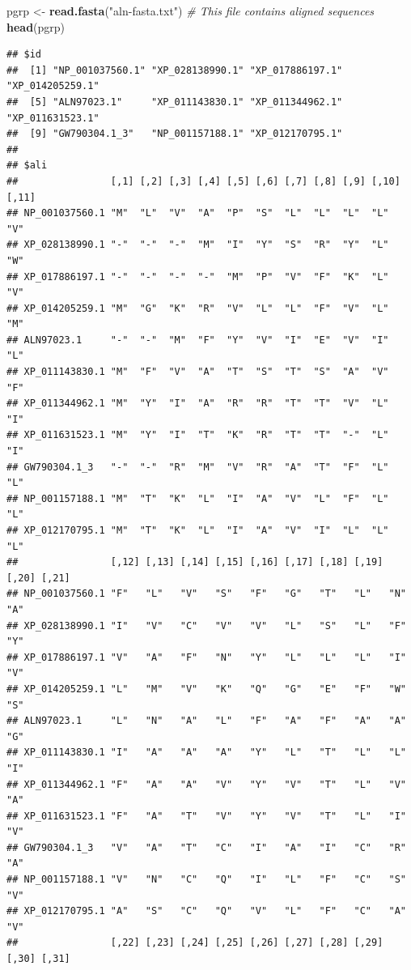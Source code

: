 \documentclass[]{article}
\newenvironment{Shaded}{\begin{snugshade}}{\end{snugshade}}
\newcommand{\KeywordTok}[1]{\textcolor[rgb]{0.13,0.29,0.53}{\textbf{#1}}}
\newcommand{\StringTok}[1]{\textcolor[rgb]{0.31,0.60,0.02}{#1}}
\newcommand{\CommentTok}[1]{\textcolor[rgb]{0.56,0.35,0.01}{\textit{#1}}}
\newcommand{\NormalTok}[1]{#1}
\begin{document}
\begin{Shaded}
\begin{Highlighting}[]
\NormalTok{pgrp <-}\StringTok{ }\KeywordTok{read.fasta}\NormalTok{(}\StringTok{"aln-fasta.txt"}\NormalTok{) }\CommentTok{# This file contains aligned sequences}
\KeywordTok{head}\NormalTok{(pgrp)}
\end{Highlighting}
\end{Shaded}

\begin{verbatim}
## $id
##  [1] "NP_001037560.1" "XP_028138990.1" "XP_017886197.1" "XP_014205259.1"
##  [5] "ALN97023.1"     "XP_011143830.1" "XP_011344962.1" "XP_011631523.1"
##  [9] "GW790304.1_3"   "NP_001157188.1" "XP_012170795.1"
## 
## $ali
##                [,1] [,2] [,3] [,4] [,5] [,6] [,7] [,8] [,9] [,10] [,11]
## NP_001037560.1 "M"  "L"  "V"  "A"  "P"  "S"  "L"  "L"  "L"  "L"   "V"  
## XP_028138990.1 "-"  "-"  "-"  "M"  "I"  "Y"  "S"  "R"  "Y"  "L"   "W"  
## XP_017886197.1 "-"  "-"  "-"  "-"  "M"  "P"  "V"  "F"  "K"  "L"   "V"  
## XP_014205259.1 "M"  "G"  "K"  "R"  "V"  "L"  "L"  "F"  "V"  "L"   "M"  
## ALN97023.1     "-"  "-"  "M"  "F"  "Y"  "V"  "I"  "E"  "V"  "I"   "L"  
## XP_011143830.1 "M"  "F"  "V"  "A"  "T"  "S"  "T"  "S"  "A"  "V"   "F"  
## XP_011344962.1 "M"  "Y"  "I"  "A"  "R"  "R"  "T"  "T"  "V"  "L"   "I"  
## XP_011631523.1 "M"  "Y"  "I"  "T"  "K"  "R"  "T"  "T"  "-"  "L"   "I"  
## GW790304.1_3   "-"  "-"  "R"  "M"  "V"  "R"  "A"  "T"  "F"  "L"   "L"  
## NP_001157188.1 "M"  "T"  "K"  "L"  "I"  "A"  "V"  "L"  "F"  "L"   "L"  
## XP_012170795.1 "M"  "T"  "K"  "L"  "I"  "A"  "V"  "I"  "L"  "L"   "L"  
##                [,12] [,13] [,14] [,15] [,16] [,17] [,18] [,19] [,20] [,21]
## NP_001037560.1 "F"   "L"   "V"   "S"   "F"   "G"   "T"   "L"   "N"   "A"  
## XP_028138990.1 "I"   "V"   "C"   "V"   "V"   "L"   "S"   "L"   "F"   "Y"  
## XP_017886197.1 "V"   "A"   "F"   "N"   "Y"   "L"   "L"   "L"   "I"   "V"  
## XP_014205259.1 "L"   "M"   "V"   "K"   "Q"   "G"   "E"   "F"   "W"   "S"  
## ALN97023.1     "L"   "N"   "A"   "L"   "F"   "A"   "F"   "A"   "A"   "G"  
## XP_011143830.1 "I"   "A"   "A"   "A"   "Y"   "L"   "T"   "L"   "L"   "I"  
## XP_011344962.1 "F"   "A"   "A"   "V"   "Y"   "V"   "T"   "L"   "V"   "A"  
## XP_011631523.1 "F"   "A"   "T"   "V"   "Y"   "V"   "T"   "L"   "I"   "V"  
## GW790304.1_3   "V"   "A"   "T"   "C"   "I"   "A"   "I"   "C"   "R"   "A"  
## NP_001157188.1 "V"   "N"   "C"   "Q"   "I"   "L"   "F"   "C"   "S"   "V"  
## XP_012170795.1 "A"   "S"   "C"   "Q"   "V"   "L"   "F"   "C"   "A"   "V"  
##                [,22] [,23] [,24] [,25] [,26] [,27] [,28] [,29] [,30] [,31]

\end{verbatim}
\end{document}
